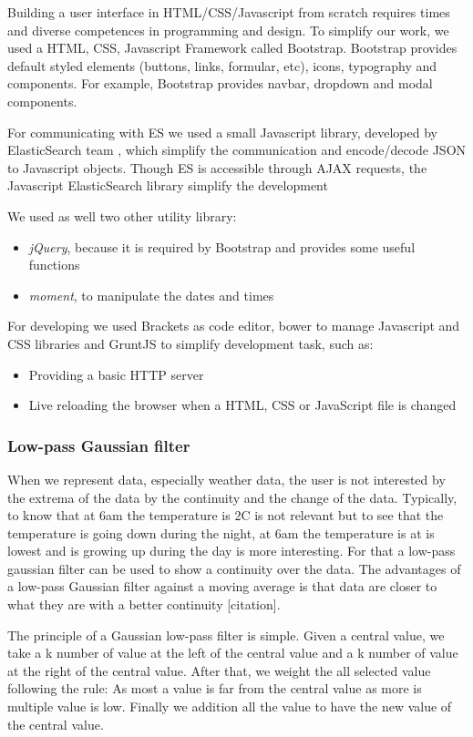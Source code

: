\documentclass{acm_proc_article-sp}
\begin{document}
Building a user interface in HTML/CSS/Javascript from scratch requires times and diverse competences in programming and design. To simplify our work, we used a HTML, CSS, Javascript Framework called Bootstrap. Bootstrap provides default styled elements (buttons, links, formular, etc), icons, typography and components. For example, Bootstrap provides navbar, dropdown and modal components.

For communicating with ES we used a small Javascript library, developed by ElasticSearch team \cite{es_javascript}, which simplify the communication and encode/decode JSON to Javascript objects. Though ES is accessible through AJAX requests, the Javascript ElasticSearch library simplify the development

We used as well two other utility library:
\begin{itemize}
\item \emph{jQuery}\cite{jquery}, because it is required by Bootstrap and provides some useful functions
\item \emph{moment}\cite{moment}, to manipulate the dates and times
\end{itemize}

For developing we used Brackets as code editor, bower to manage Javascript and CSS libraries and GruntJS to simplify development task, such as:
\begin{itemize}
 \item Providing a basic HTTP server 
 \item Live reloading the browser when a HTML, CSS or JavaScript file is changed
\end{itemize}

\subsubsection{Low-pass Gaussian filter}
When we represent data, especially weather data, the user is not interested by the extrema of the data by the continuity and the change of the data. Typically, to know that at 6am the temperature is 2\degree C is not relevant but to see that the temperature is going down during the night, at 6am the temperature is at is lowest and is growing up during the day is more interesting. For that a low-pass gaussian filter can be used to show a continuity over the data. The advantages of a low-pass Gaussian filter against a moving average is that data are closer to what they are with a better continuity [citation].

The principle of a Gaussian low-pass filter is simple. Given a central value, we take a k number of value at the left of the central value and a k number of value at the right of the central value. After that, we weight the all selected value following the rule:  As most a value is far from the central value as more is multiple value is low. Finally we addition all the value to have the new value of the central value.
\end{document}
